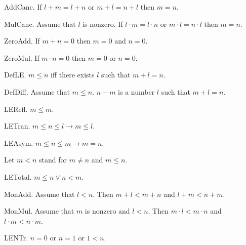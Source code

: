 \begin{axiom} AddCanc.  
If $l + m = l + n$ or $m + l = n + l$ then $m = n$.\end{axiom}

\begin{axiom} MulCanc.
Assume that $l$ is nonzero. If 
$l \cdot m = l \cdot n$ or $m \cdot l = n \cdot l$ 
then $m = n$.\end{axiom}

\begin{axiom} ZeroAdd.
If $m + n = 0$ then $m = 0$ and $n = 0$.\end{axiom}

\begin{lemma} ZeroMul.
If $m \cdot n = 0$ then $m = 0$ or $n = 0$.
\end{lemma}

\begin{definition} DefLE.
$m \leq n$ iff there exists $l$ such that $m + l = n$.
\end{definition}

\begin{definition} DefDiff.  Assume that $m \leq n$.
$n - m$ is a number $l$ such that $m + l = n$.
\end{definition}

\begin{lemma} LERefl. $m \leq m$. \end{lemma}
\begin{lemma} LETran. $m \leq n \leq l  \rightarrow  m \leq l$.
\end{lemma}
\begin{lemma} LEAsym. $m \leq n \leq m  \rightarrow  m = n$. 
\end{lemma}

Let $m < n$ stand for $m \neq n$ and $m \leq n$.

\begin{axiom} LETotal. $m \leq n \vee n < m$. \end{axiom}

\begin{lemma} MonAdd. Assume that $l < n$.
Then $m + l < m + n$ and $l + m < n + m$.
\end{lemma}

\begin{lemma} MonMul. Assume that $m$ is nonzero and $l < n$.
Then $m \cdot l < m \cdot n$ and $l \cdot m < n \cdot m$.
\end{lemma}

\begin{axiom} LENTr. 
$n = 0$ or $n = 1$ or $1 < n$.\end{axiom}


